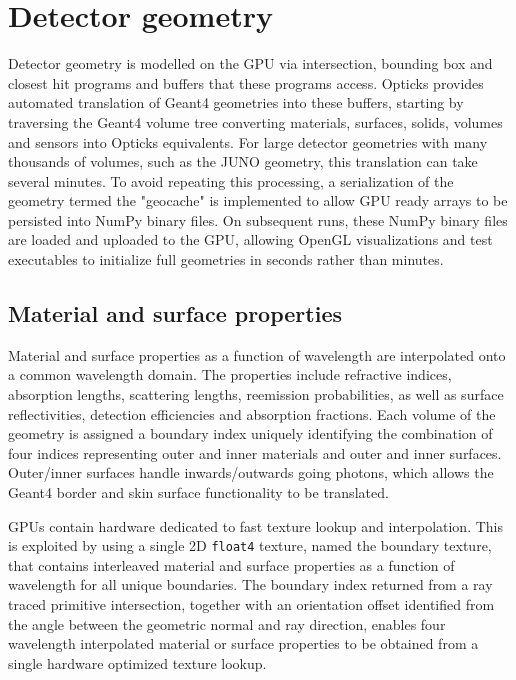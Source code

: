 \documentclass{webofc}
\begin{document}
\section{Detector geometry} 
%
%
Detector geometry is modelled on the GPU via intersection, bounding box 
and closest hit programs and buffers that these programs access.
Opticks provides automated translation of Geant4 geometries into these buffers, starting 
by traversing the Geant4 volume tree converting materials, surfaces, solids, volumes and sensors 
into Opticks equivalents. 
%
%
For large detector geometries with many thousands of volumes, such as the JUNO geometry, 
this translation can take several minutes. To avoid repeating this processing, a serialization 
of the geometry termed the "geocache" is implemented to allow GPU ready arrays to be persisted into NumPy\cite{numpy} binary files.
On subsequent runs, these NumPy binary files are loaded and uploaded to the GPU, allowing OpenGL visualizations 
and test executables to initialize full geometries in seconds rather than minutes.
%
\subsection{Material and surface properties} 

Material and surface properties as a function of wavelength are interpolated onto a common wavelength domain.
The properties include refractive indices, absorption lengths, scattering lengths, reemission probabilities, 
as well as surface reflectivities, detection efficiencies and absorption fractions. 
Each volume of the geometry is assigned a boundary index uniquely identifying the combination of four indices representing 
outer and inner materials and outer and inner surfaces. Outer/inner surfaces handle inwards/outwards going photons, which allows the Geant4 border and skin
surface functionality to be translated. 

GPUs contain hardware dedicated to fast texture lookup and interpolation.
This is exploited by using a single 2D {\tt float4} texture, named the boundary texture,
that contains interleaved material and surface properties as a function of wavelength for all
unique boundaries.
The boundary index returned from a ray traced primitive intersection, together with
an orientation offset identified from the angle between the geometric normal and ray direction,
enables four wavelength interpolated material or surface properties to be
obtained from a single hardware optimized texture lookup.
\end{document}
